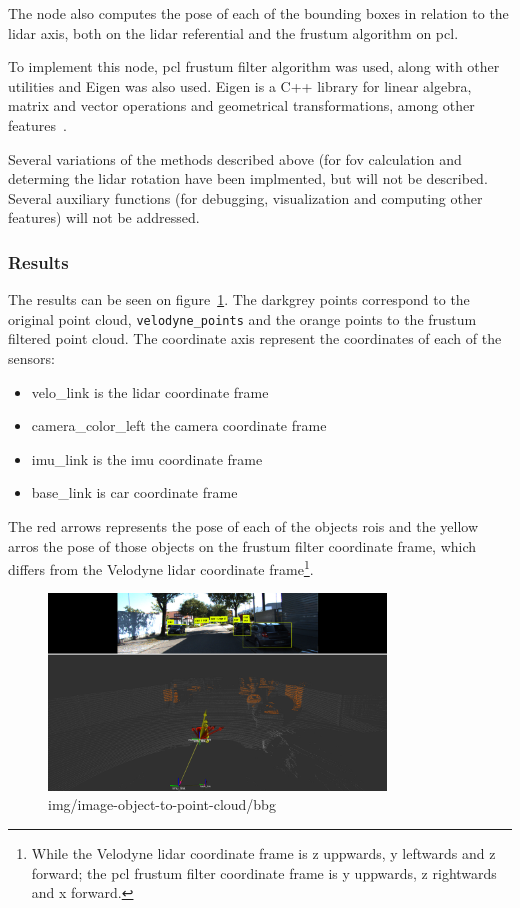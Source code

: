 The node also computes the pose of each of the bounding boxes in relation to the \ac{lidar} axis, both on the \ac{lidar} referential and the frustum algorithm on \ac{pcl}. 

To implement this node, \ac{pcl} frustum filter algorithm was used, along with other utilities and Eigen was also used. Eigen is a C++ library for linear algebra, matrix and vector operations and geometrical transformations, among other features~\cite{Eigenv3}.

Several variations of the methods described above (for \ac{fov} calculation and determing the \ac{lidar} rotation have been implmented, but will not be described. Several auxiliary functions (for debugging, visualization and computing other features) will not be addressed.


\subsubsection{Results}
The results can be seen on figure~\ref{fig:bbox-correspondences-on-kitti}. The darkgrey points correspond to the original point cloud, \texttt{velodyne\_points} and the orange points to the frustum filtered point cloud. The coordinate axis represent the coordinates of each of the sensors:

\begin{itemize}
	\item velo\_link is the \ac{lidar} coordinate frame
	\item camera\_color\_left the camera coordinate frame
	\item imu\_link is the \ac{imu} coordinate frame
	\item base\_link is car coordinate frame
\end{itemize}

The red arrows represents the pose of each of the objects \acp{roi} and the yellow arros the pose of those objects on the frustum filter coordinate frame, which differs from the Velodyne \ac{lidar} coordinate frame\footnote{While the Velodyne \ac{lidar} coordinate frame is z uppwards, y leftwards and z forward; the \ac{pcl} frustum filter coordinate frame is y uppwards, z rightwards and x forward.}.

\begin{figure}[H]
	\centering
	\includegraphics[width=0.8\textwidth]{img/image-object-to-point-cloud/bbox_correspondences_on_kitti.png}
	\caption{img/image-object-to-point-cloud/bbg}
	\label{fig:bbox-correspondences-on-kitti}
\end{figure}

